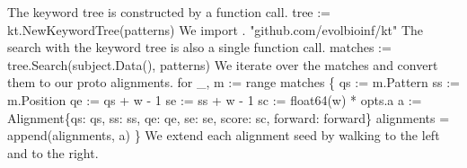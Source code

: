 The keyword tree is constructed by a function call.
\nwenddocs{}\endmoddef\nwstartdeflinemarkup{}\nwenddeflinemarkup
tree := kt.NewKeywordTree(patterns)
\nwendcode{}\nwdocspar
We import .
\nwenddocs{}\plusendmoddef\nwstartdeflinemarkup{}\nwenddeflinemarkup
"github.com/evolbioinf/kt"
\nwendcode{}\nwdocspar
The search with the keyword tree is also a single function call.
\nwenddocs{}\endmoddef\nwstartdeflinemarkup{}\nwenddeflinemarkup
matches := tree.Search(subject.Data(), patterns)
\nwendcode{}\nwdocspar
We iterate over the matches and convert them to our proto alignments.
\nwenddocs{}\endmoddef\nwstartdeflinemarkup{}\nwenddeflinemarkup
for _, m := range matches \{
          qs := m.Pattern
          ss := m.Position
          qe := qs + w - 1
          se := ss + w - 1
          sc := float64(w) * opts.a
          a := Alignment\{qs: qs, ss: ss, qe: qe,
                  se: se, score: sc, forward: forward\}
          alignments = append(alignments, a)
\}
\nwendcode{}\nwdocspar
We extend each alignment seed by walking to the left and to the right.
\nwenddocs{}\endmoddef\nwstartdeflinemarkup{}\nwenddeflinemarkup
